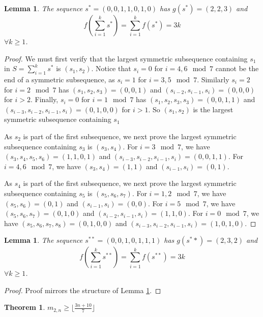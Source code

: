 \documentclass[12pt]{article}
\newtheorem{theorem}{Theorem}
\theoremstyle{plain}
\newtheorem{lemma}[thm]{Lemma}
\theoremstyle{definition}
\theoremstyle{remark}
\theoremstyle{definition}
\begin{document}
\begin{lemma}\label{lemma: special sequence}
    The sequence $s^*=(0,0,1,1,0,1,0)$ has $g(s^*)=(2,2,3)$ and  
    $$f\left(\sum_{i=1}^k s^*\right) = \sum_{i=1}^k f(s^*) = 3k$$ 
    $\forall k \geq 1$.
\end{lemma}

\begin{proof}
    We must first verify that the largest symmetric subsequence containing $s_1$ in $S=\sum_{i=1}^k s^*$ is $(s_1,s_2)$. Notice that $s_i=0$ for $i=4,6 \mod 7$ cannot be the end of a symmetric subsequence, as $s_i=1$ for $i=3,5 \mod 7$. Similarly $s_i=2$ for $i=2 \mod 7$ has $(s_1,s_2,s_3)=(0,0,1)$ and $(s_{i-2},s_{i-1},s_{i}) = (0,0,0)$ for $i>2$. Finally, $s_i=0$ for $i=1 \mod 7$ has $(s_1,s_2,s_3,s_3)=(0,0,1,1)$ and $(s_{i-3},s_{i-2},s_{i-1},s_{i})=(0,1,0,0)$ for $i>1$. So $(s_1,s_2)$ is the largest symmetric subsequence containing $s_1$

    As $s_2$ is part of the first subsequence, we next prove the largest symmetric subsequence containing $s_3$ is $(s_3,s_4)$. For $i=3 \mod 7$, we have $(s_3,s_4,s_5,s_6) = (1,1,0,1)$ and $(s_{i-3},s_{i-2},s_{i-1},s_{i}) = (0,0,1,1)$. For $i=4,6 \mod 7$, we have $(s_3,s_4) = (1,1)$ and $(s_{i-1},s_i) = (0,1)$.

    As $s_4$ is part of the first subsequence, we next prove the largest symmetric subsequence containing $s_5$ is $(s_5,s_6,s_7)$. For $i=1,2 \mod 7$, we have $(s_5,s_6)=(0,1)$ and $(s_{i-1},s_i)=(0,0)$. For $i=5 \mod 7$, we have $(s_5,s_6,s_7)=(0,1,0)$ and $(s_{i-2},s_{i-1},s_{i}) = (1,1,0)$. For $i=0 \mod 7$, we have $(s_5,s_6,s_7,s_8)=(0,1,0,0)$ and $(s_{i-3},s_{i-2},s_{i-1},s_{i})=(1,0,1,0)$.

\end{proof}

\begin{lemma}\label{lemma: other special sequence}
    The sequence $s^{**}=(0,0,1,0,1,1,1)$ has $g(s^**) = (2,3,2)$ and 
    $$f\left(\sum_{i=1}^k s^{**}\right) = \sum_{i=1}^k f(s^{**}) = 3k$$ 
    $\forall k \geq 1$.
\end{lemma}

\begin{proof}
    Proof mirrors the structure of Lemma \ref{lemma: special sequence}.
\end{proof}

\begin{theorem}
    $m_{2,n} \geq \lfloor\frac{3n+10}{7}\rfloor$
\end{theorem}
\end{document}
